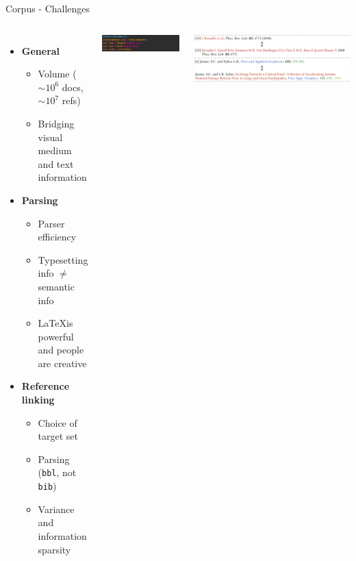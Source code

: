 \documentclass[en,16:9,smallfoot]{sdqbeamer}
\begin{document}
   \begin{frame}{Corpus - Challenges}
   \begin{columns}
        \begin{itemize}
            \item \textbf{General}
            \begin{itemize}
                \item Volume ($\sim10^6$ docs, $\sim10^7$ refs)
                \item Bridging visual medium and text information  %
            \end{itemize}
            \item \textbf{Parsing}
            \begin{itemize}
                \item Parser efficiency
                \item Typesetting info $\neq$ semantic info
                \item \LaTeX is powerful and people are creative
            \end{itemize}
            \item \textbf{Reference linking}
            \begin{itemize}
                \item Choice of target set
                \item Parsing (\texttt{bbl}, not \texttt{bib})
                \item Variance and information sparsity
            \end{itemize}
        \end{itemize}
          \centering
          \includegraphics[width=0.8\linewidth]{imgs/renewcommand}

          \vspace{0.5cm}
          \includegraphics[width=\linewidth]{imgs/hardmatch_examples}
   \end{columns}
   \end{frame}
\end{document}
